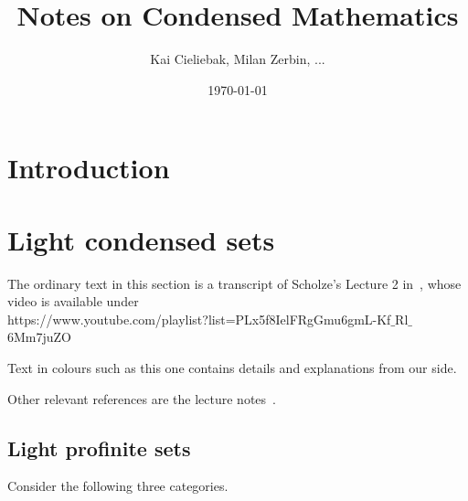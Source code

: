 \documentclass[12pt,a4paper]{amsart}
\theoremstyle{definition}
\theoremstyle{theorem}
\newcommand{\kai}{\color{red}}
\begin{document}
\title{Notes on Condensed Mathematics} 
\author{Kai Cieliebak, Milan Zerbin, ...}
\date{\today}




\maketitle

\tableofcontents


\section{Introduction}\label{sec:intro}

\section{Light condensed sets}\label{sec:light-condensed-sets}

The ordinary text in this section is a transcript of Scholze's Lecture
2 in~\cite{Clausen-Scholze-IHES}, whose video is available under\\
https://www.youtube.com/playlist?list=PLx5f8IelFRgGmu6gmL-Kf$\_$Rl$\_$6Mm7juZO

Text in colours such as {\kai this one} contains details and
explanations from our side. 

Other relevant references are the lecture
notes~\cite{Scholze-condensed,Scholze-analytic,Clausen-Scholze-complex}. 

\subsection{Light profinite sets}

Consider the following three categories.
\end{document}
